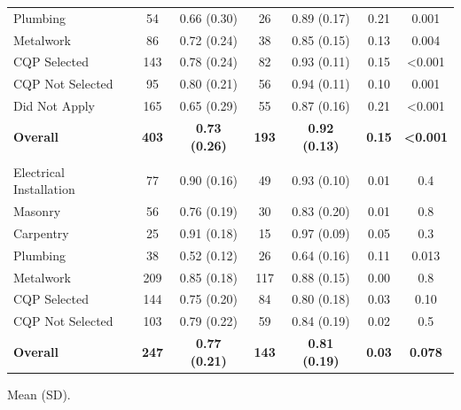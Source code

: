 \documentclass[
  11pt,
a4paper
]{article}
\begin{document}
\begin{table}[H]
{\begin{threeparttable}
\begin{tabular}[t]{lcccccc}
\hspace{1em}Plumbing & 54 & 0.66 (0.30) & 26 & 0.89 (0.17) & 0.21 & 0.001\\
\hspace{1em}Metalwork & 86 & 0.72 (0.24) & 38 & 0.85 (0.15) & 0.13 & 0.004\\
\hspace{1em}CQP Selected & 143 & 0.78 (0.24) & 82 & 0.93 (0.11) & 0.15 & <0.001\\
\hspace{1em}CQP Not Selected & 95 & 0.80 (0.21) & 56 & 0.94 (0.11) & 0.10 & 0.001\\
\hspace{1em}Did Not Apply & 165 & 0.65 (0.29) & 55 & 0.87 (0.16) & 0.21 & <0.001\\
\textbf{\hspace{1em}Overall} & \textbf{403} & \textbf{0.73 (0.26)} & \textbf{193} & \textbf{0.92 (0.13)} & \textbf{0.15} & \textbf{<0.001}\\
\addlinespace[0.3em]
\multicolumn{7}{l}{\textbf{Knowledge²}}\\
\hspace{1em}Electrical Installation & 77 & 0.90 (0.16) & 49 & 0.93 (0.10) & 0.01 & 0.4\\
\hspace{1em}Masonry & 56 & 0.76 (0.19) & 30 & 0.83 (0.20) & 0.01 & 0.8\\
\hspace{1em}Carpentry & 25 & 0.91 (0.18) & 15 & 0.97 (0.09) & 0.05 & 0.3\\
\hspace{1em}Plumbing & 38 & 0.52 (0.12) & 26 & 0.64 (0.16) & 0.11 & 0.013\\
\hspace{1em}Metalwork & 209 & 0.85 (0.18) & 117 & 0.88 (0.15) & 0.00 & 0.8\\
\hspace{1em}CQP Selected & 144 & 0.75 (0.20) & 84 & 0.80 (0.18) & 0.03 & 0.10\\
\hspace{1em}CQP Not Selected & 103 & 0.79 (0.22) & 59 & 0.84 (0.19) & 0.02 & 0.5\\
\textbf{\hspace{1em}Overall} & \textbf{247} & \textbf{0.77 (0.21)} & \textbf{143} & \textbf{0.81 (0.19)} & \textbf{0.03} & \textbf{0.078}\\
\bottomrule
\end{tabular}
\begin{tablenotes}
\small
\item Mean (SD).

\end{tablenotes}
\end{threeparttable}}
\end{table}
\end{document}
